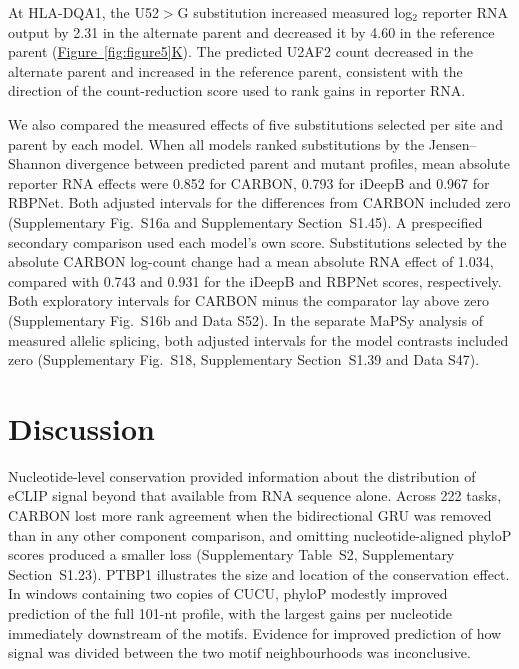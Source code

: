 \documentclass[webpdf,contemporary,large]{current_assets/oup-authoring-template}
\newcommand{\figpanelref}[2]{\hyperref[#1]{Figure~\ref*{#1}#2}}
\newcommand{\supfig}[1]{Supplementary Fig.~#1}
\newcommand{\suptab}[1]{Supplementary Table~#1}
\newcommand{\supsect}[1]{Supplementary Section~#1}
\begin{document}
At HLA-DQA1, the U52$>$G substitution increased measured log$_2$ reporter RNA output by 2.31 in the alternate parent and decreased it by 4.60 in the reference parent (\figpanelref{fig:figure5}{K}). The predicted U2AF2 count decreased in the alternate parent and increased in the reference parent, consistent with the direction of the count-reduction score used to rank gains in reporter RNA.

We also compared the measured effects of five substitutions selected per site and parent by each model. When all models ranked substitutions by the Jensen--Shannon divergence between predicted parent and mutant profiles, mean absolute reporter RNA effects were 0.852 for CARBON, 0.793 for iDeepB and 0.967 for RBPNet. Both adjusted intervals for the differences from CARBON included zero (\supfig{S16a} and \supsect{S1.45}). A prespecified secondary comparison used each model's own score. Substitutions selected by the absolute CARBON log-count change had a mean absolute RNA effect of 1.034, compared with 0.743 and 0.931 for the iDeepB and RBPNet scores, respectively. Both exploratory intervals for CARBON minus the comparator lay above zero (\supfig{S16b} and Data S52). In the separate MaPSy analysis of measured allelic splicing, both adjusted intervals for the model contrasts included zero (\supfig{S18}, \supsect{S1.39} and Data S47).

\FloatBarrier

\section{Discussion}\label{sec:discussion}

Nucleotide-level conservation provided information about the distribution of eCLIP signal beyond that available from RNA sequence alone. Across 222 tasks, CARBON lost more rank agreement when the bidirectional GRU was removed than in any other component comparison, and omitting nucleotide-aligned phyloP scores produced a smaller loss (\suptab{S2}, \supsect{S1.23}). PTBP1 illustrates the size and location of the conservation effect. In windows containing two copies of CUCU, phyloP modestly improved prediction of the full 101-nt profile, with the largest gains per nucleotide immediately downstream of the motifs. Evidence for improved prediction of how signal was divided between the two motif neighbourhoods was inconclusive.
\end{document}
